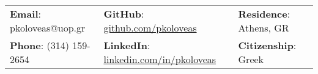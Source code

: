 \documentclass[letterpaper, 11pt]{article}
\begin{document}


\vspace{0.5cm} 
\begin{center}
\begin{tabular}{lll}
\textbf{Email}: pkoloveas@uop.gr      &
\hspace{0.55in} \textbf{GitHub}: \href{https://github.com/pariskoloveas}{github.com/pkoloveas}   & 
\hspace{0.4in} 	\textbf{Residence}: Athens, GR \\

\textbf{Phone}: (314) 159-2654   & 
\hspace{0.55in} \textbf{LinkedIn}: \href{https://www.linkedin.com/in/pkoloveas/}{linkedin.com/in/pkoloveas}    &
\hspace{0.4in} \textbf{Citizenship}: Greek 
\end{tabular}
\end{center}


\setlength{\tabcolsep}{8pt}
\end{document}
